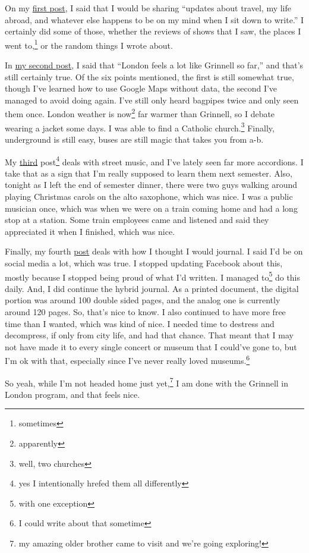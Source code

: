 \documentclass[12pt]{article}[titlepage]
\newcommand{\say}[1]{``#1''}
\newcommand{\1}{\={a}}
\newcommand{\2}{\={e}}
\newcommand{\3}{\={\i}}
\newcommand{\4}{\=o}
\newcommand{\5}{\=u}
\newcommand{\6}{\={A}}
\renewcommand{\,}{\textsuperscript{,}}
\begin{document}
On my \href{hello-world.html}{first post}, I said that I would be sharing \say{updates about travel, my life abroad, and whatever else happens to be on my mind when I sit down to write.}
I certainly did some of those, whether the reviews of shows that I saw, the places I went to,\footnote{sometimes} or the random things I wrote about.

In \href{first-56-hours.html}{my second post}, I said that \say{London feels a lot like Grinnell so far,} and that's still certainly true.
Of the six points mentioned, the first is still somewhat true, though I've learned how to use Google Maps without data, the second I've managed to avoid doing again.
I've still only heard bagpipes twice and only seen them once.
London weather is now\footnote{apparently} far warmer than Grinnell, so I debate wearing a jacket some days.
I was able to find a Catholic church.\footnote{well, two churches}
Finally, underground is still easy, buses are still magic that takes you from a-b.

My \href{street-music-in-london}{third} post\footnote{yes I intentionally hrefed them all differently} deals with street music, and I've lately seen far more accordions.
I take that as a sign that I'm really supposed to learn them next semester.
Also, tonight as I left the end of semester dinner, there were two guys walking around playing Christmas carols on the alto saxophone, which was nice.
I was a public musician once, which was when we were on a train coming home and had a long stop at a station.
Some train employees came and listened and said they appreciated it when I finished, which was nice.

Finally, my fourth \href{how-im-keeping-track-of-my-time-abroad.html}{post} deals with how I thought I would journal.
I said I'd be on social media a lot, which was true.
I stopped updating Facebook about this, mostly because I stopped being proud of what I'd written.
I managed to\footnote{with one exception} do this daily.
And, I did continue the hybrid journal.
As a printed document, the digital portion was around 100 double sided pages, and the analog one is currently around 120 pages.
So, that's nice to know.
I also continued to have more free time than I wanted, which was kind of nice.
I needed time to destress and decompress, if only from city life, and had that chance.
That meant that I may not have made it to every single concert or museum that I could've gone to, but I'm ok with that, especially since I've never really loved museums.\footnote{I could write about that sometime}

So yeah, while I'm not headed home just yet,\footnote{my amazing older brother came to visit and we're going exploring!} I am done with the Grinnell in London program, and that feels nice.
\end{document}
